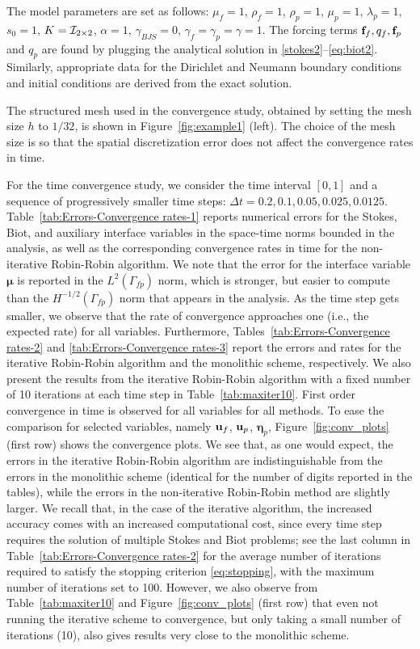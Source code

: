\documentclass[11pt]{article}
\def\u{{\bf u}}
\def\f{{\bf f}}
\def\bbeta{\boldsymbol{\eta}}
\def\bmu{\boldsymbol{\mu}}
\def\I{{\cal I}}
\begin{document}
The model parameters are set as follows:
$\mu_f = 1$, $\rho_f = 1$, $\rho_p = 1$,
$\mu_p = 1$,  $\lambda_p = 1$, $s_0 = 1$, $K = \I_{2\times2}$, $\alpha = 1$,  $\gamma_{BJS} = 0$, $\gamma_f = \gamma_p = \gamma = 1$. The forcing terms $\f_f,  q_f,  \f_p$ and $q_p$ are found by plugging the analytical solution in \eqref{stokes2}--\eqref{eq:biot2}.
Similarly, appropriate data for the Dirichlet and Neumann boundary conditions and initial conditions are derived from the exact solution. 

The structured mesh used in the convergence study, obtained by setting the mesh size $h$ to $1/32$, is shown in Figure~\ref{fig:example1} (left).
The choice of the mesh size is so that the spatial discretization error does not affect the convergence rates in time. 

For the time convergence study, we consider the time interval $[0,1]$ and a sequence of progressively smaller time steps: $\Delta t = 0.2, 0.1, 0.05, 0.025, 0.0125$. 
Table~\ref{tab:Errors-Convergence rates-1} reports numerical errors for the Stokes, Biot, and auxiliary interface variables in the space-time norms bounded in the analysis, as well as
the corresponding convergence rates in time for the non-iterative Robin-Robin algorithm. We note that the error for the interface variable $\bmu$ is reported in the $L^2(\Gamma_{fp})$ norm, which is stronger, but easier to compute than the $H^{-1/2}(\Gamma_{fp})$ norm that appears in the analysis.
As the time step gets smaller, we observe that the rate of convergence
approaches one (i.e., the expected rate)
for all variables. Furthermore, 
Tables~\ref{tab:Errors-Convergence rates-2} and 
\ref{tab:Errors-Convergence rates-3} report the 
errors and rates for the iterative Robin-Robin algorithm and the monolithic scheme, respectively.
We also present the results from the iterative Robin-Robin algorithm with a fixed number of 10 iterations at each time step in Table~\ref{tab:maxiter10}.
First order convergence in time is observed for all variables for all methods.
To ease the comparison for selected variables, 
namely $\u_f$, $\u_p$, $\bbeta_p$, Figure~\ref{fig:conv_plots} (first row)
shows the convergence plots. 
We see that, as one would expect, the errors in the iterative Robin-Robin algorithm are indistinguishable from the errors in the monolithic scheme (identical for the number of digits reported in the tables), while the errors in the non-iterative Robin-Robin method are slightly larger. We recall that, in the case of the iterative algorithm, the increased accuracy
comes with an increased computational cost, since every time step requires the solution of multiple Stokes and Biot problems; see the last column in Table~\ref{tab:Errors-Convergence rates-2}
for the average number of iterations required to satisfy the stopping criterion \eqref{eq:stopping}, with the maximum number of iterations set to 100. However, we also observe from Table~\ref{tab:maxiter10} and Figure~\ref{fig:conv_plots} (first row) that even not running the iterative scheme to convergence, but only taking a small number of iterations (10), also gives results very close to the monolithic scheme. 
\end{document}
